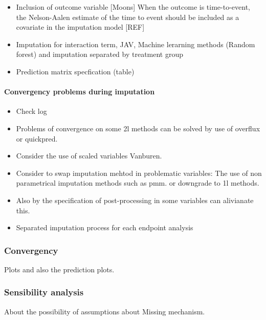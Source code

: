 \documentclass[
]{jss}
\providecommand{\tightlist}{%
  \setlength{\itemsep}{0pt}\setlength{\parskip}{0pt}}
\begin{document}
\begin{itemize}
\tightlist
\item
  Inclusion of outcome variable {[}Moons{]} When the outcome is
  time-to-event, the Nelson-Aalen estimate of the time to event should
  be included as a covariate in the imputation model {[}REF{]}
\item
  Imputation for interaction term, JAV, Machine lerarning methods
  (Random forest) and imputation separated by treatment group
\item
  Prediction matrix specfication (table)
\end{itemize}

\hypertarget{convergency-problems-during-imputation}{%
\paragraph{Convergency problems during
imputation}\label{convergency-problems-during-imputation}}

\begin{itemize}
\tightlist
\item
  Check log
\item
  Problems of convergence on some 2l methods can be solved by use of
  overflux or quickpred.
\item
  Consider the use of scaled variables Vanburen.
\item
  Consider to swap imputation mehtod in problematic variables: The use
  of non parametrical imputation methods such as pmm. or downgrade to 1l
  methods.
\item
  Also by the specification of post-processing in some variables can
  alivianate this.
\item
  Separated imputation process for each endpoint analysis
\end{itemize}

\hypertarget{convergency}{%
\subsubsection{Convergency}\label{convergency}}

Plots and also the prediction plots.

\hypertarget{sensibility-analysis}{%
\subsubsection{Sensibility analysis}\label{sensibility-analysis}}

About the possibility of assumptions about Missing mechanism.
\end{document}
